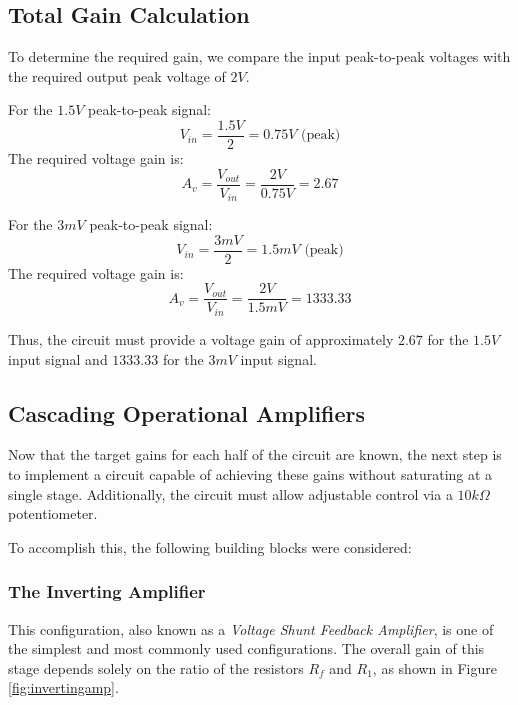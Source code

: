 \documentclass[12pt]{article}
\begin{document}
\subsection{Total Gain Calculation}

To determine the required gain, we compare the input peak-to-peak voltages with the required output peak voltage of $2V$.

For the $1.5V$ peak-to-peak signal:
\begin{equation}
	V_{in} = \frac{1.5V}{2} = 0.75V \text{ (peak)}
\end{equation}
The required voltage gain is:
\begin{equation}
	A_v = \frac{V_{out}}{V_{in}} = \frac{2V}{0.75V} = 2.67
\end{equation}

For the $3mV$ peak-to-peak signal:
\begin{equation}
	V_{in} = \frac{3mV}{2} = 1.5mV \text{ (peak)}
\end{equation}
The required voltage gain is:
\begin{equation}
	A_v = \frac{V_{out}}{V_{in}} = \frac{2V}{1.5mV} = 1333.33
\end{equation}

Thus, the circuit must provide a voltage gain of approximately $2.67$ for the $1.5V$ input signal and $1333.33$ for the $3mV$ input signal.

\subsection{Cascading Operational Amplifiers}

Now that the target gains for each half of the circuit are known, the next step
is to implement a circuit capable of achieving these gains without saturating at
a single stage. Additionally, the circuit must allow adjustable control via a
$10k\Omega$ potentiometer.

To accomplish this, the following building blocks were considered:

\subsubsection{The Inverting Amplifier}

This configuration, also known as a \textit{Voltage Shunt Feedback Amplifier},
is one of the simplest and most commonly used configurations. The overall gain
of this stage depends solely on the ratio of the resistors $R_f$ and $R_1$, as
shown in Figure \ref{fig:invertingamp}.
\end{document}
